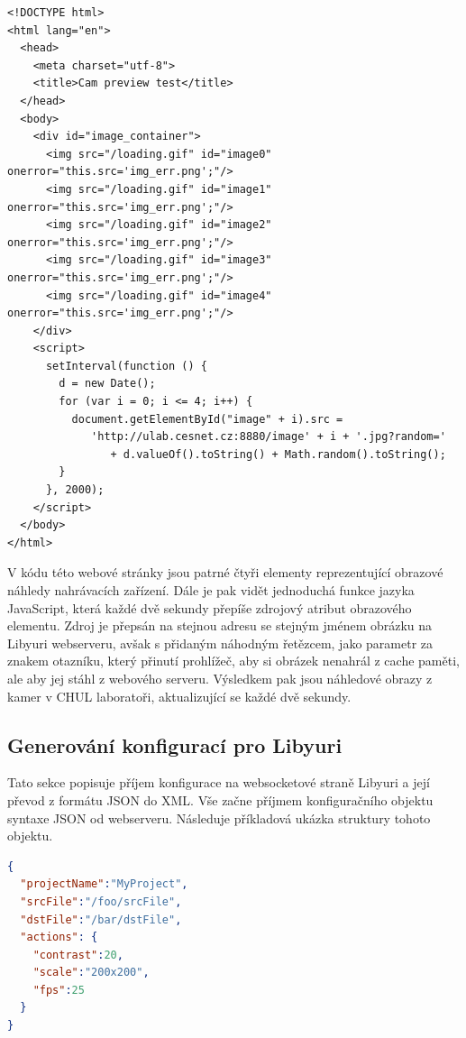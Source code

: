 \documentclass[thesis=M,czech]{FITthesis}[2012/06/26]
\begin{document}
\begin{lstlisting}[style=htmlcssjs]
<!DOCTYPE html>
<html lang="en">
  <head>
    <meta charset="utf-8">
    <title>Cam preview test</title>
  </head>
  <body>
    <div id="image_container">
      <img src="/loading.gif" id="image0" onerror="this.src='img_err.png';"/>
      <img src="/loading.gif" id="image1" onerror="this.src='img_err.png';"/>
      <img src="/loading.gif" id="image2" onerror="this.src='img_err.png';"/>
      <img src="/loading.gif" id="image3" onerror="this.src='img_err.png';"/>
      <img src="/loading.gif" id="image4" onerror="this.src='img_err.png';"/>
    </div>
    <script>
      setInterval(function () {
        d = new Date();
        for (var i = 0; i <= 4; i++) {
          document.getElementById("image" + i).src = 
             'http://ulab.cesnet.cz:8880/image' + i + '.jpg?random='
                + d.valueOf().toString() + Math.random().toString();
        }
      }, 2000);
    </script>
  </body>
</html>
\end{lstlisting}

V kódu této webové stránky jsou patrné čtyři elementy  reprezentující obrazové náhledy nahrávacích zařízení. Dále je pak vidět jednoduchá funkce jazyka JavaScript, která každé dvě sekundy přepíše zdrojový atribut obrazového elementu. Zdroj je přepsán na stejnou adresu se stejným jménem obrázku na Libyuri webserveru, avšak s přidaným náhodným řetězcem, jako parametr za znakem otazníku, který přinutí prohlížeč, aby si obrázek nenahrál z cache paměti, ale aby jej stáhl z webového serveru. Výsledkem pak jsou náhledové obrazy z kamer v CHUL laboratoři, aktualizující se každé dvě sekundy.


\subsection{Generování konfigurací pro Libyuri} \label{subsec:impl_funkce_generate}
Tato sekce popisuje příjem konfigurace na websocketové straně Libyuri a její převod z formátu JSON do XML. Vše začne příjmem konfiguračního objektu syntaxe JSON od webserveru. Následuje příkladová ukázka struktury tohoto objektu.\\

\begin{lstlisting}[language=json]
{
  "projectName":"MyProject",
  "srcFile":"/foo/srcFile",
  "dstFile":"/bar/dstFile",
  "actions": {
    "contrast":20,
    "scale":"200x200",
    "fps":25
  }
}
\end{lstlisting}
\end{document}
